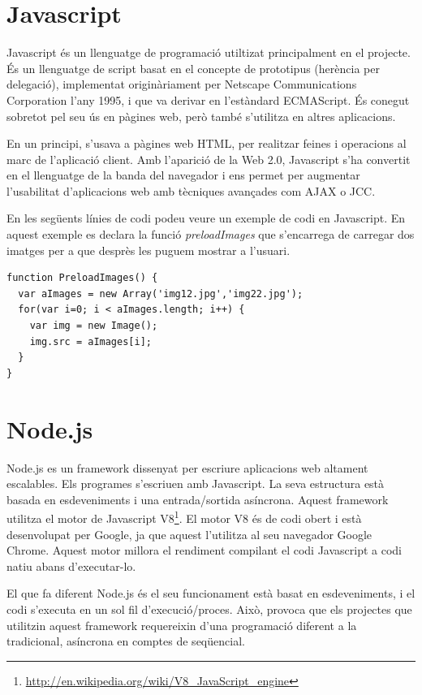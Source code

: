 \section{Javascript}

Javascript és un llenguatge de programació utiltizat principalment en el projecte. És un llenguatge de script basat en el concepte de prototipus (herència per delegació), implementat originàriament per Netscape Communications Corporation l'any 1995, i que va derivar en l'estàndard ECMAScript. És conegut sobretot pel seu ús en pàgines web, però també s'utilitza en altres aplicacions.

En un principi, s'usava a pàgines web HTML, per realitzar feines i operacions al marc de l'aplicació client. Amb l'aparició de la Web 2.0, Javascript s'ha convertit en el llenguatge de la banda del navegador i ens permet per augmentar l'usabilitat d'aplicacions web amb tècniques avançades com AJAX o JCC.

En les següents línies de codi podeu veure un exemple de codi en Javascript. En aquest exemple es declara la funció \emph{preloadImages} que s'encarrega de carregar dos imatges per a que desprès les puguem mostrar a l'usuari.
 
\begin{lstlisting}
function PreloadImages() {
  var aImages = new Array('img12.jpg','img22.jpg');
  for(var i=0; i < aImages.length; i++) {
    var img = new Image();
    img.src = aImages[i];
  }
}
\end{lstlisting}



\section{Node.js}
\label{sec:node.js-min}
Node.js es un framework dissenyat per escriure aplicacions web altament escalables. Els programes s'escriuen amb Javascript. La seva estructura està basada en esdeveniments i una entrada/sortida asíncrona. Aquest framework utilitza el motor de Javascript V8\footnote{\url{http://en.wikipedia.org/wiki/V8_JavaScript_engine}}. El motor V8 és de codi obert i està desenvolupat per Google, ja que aquest l'utilitza al seu navegador Google Chrome. Aquest motor millora el rendiment compilant el codi Javascript a codi natiu abans d'executar-lo.

El que fa diferent Node.js és el seu funcionament està basat en esdeveniments, i el codi s'executa en un sol fil d'execució/proces. Això, provoca que els projectes que utilitzin aquest framework requereixin d'una programació diferent a la tradicional, asíncrona en comptes de seqüencial. 


